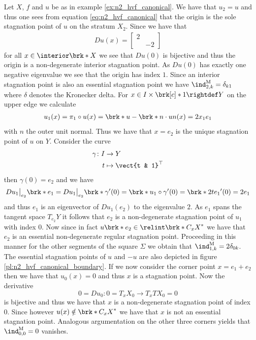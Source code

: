 \begin{example}\label{ex:n2_hvf_index}
  Let $X$, $f$ and $u$ be as in example \ref{ex:n2_hvf_canonical}.
  We have that $u_2=u$ and thus
  one sees from equation \eqref{eq:n2_hvf_canonical}
  that the origin is the sole stagnation point of $u$ on the stratum $X_2$. Since we have that
  \begin{align*}
    Du(x) = \begin{bmatrix}
      2 & \\
       & -2
    \end{bmatrix}
  \end{align*}
  for all $x\in\openX$ we see that $Du(0)$ is bijective and thus the origin is a non-degenerate interior stagnation point.
  As $Du(0)$ has
  exactly one negative eigenvalue we see that the origin has index $1$. 
  Since an interior stagnation point is also an essential stagnation point 
  we have $\ind^\text{M}_{2,k}=\delta_{k1}$ where $\delta$ denotes the Kronecker delta.
  For $x\in I\times\brk[c]*{1}\rightdef Y$ on the upper edge we calculate
  \begin{align*}
    u_1(x)=\pi_1\circ u(x)=\brk*{u-\brk*{n\cdot u}n}(x)
    =2x_1e_1
  \end{align*}
  with $n$ the outer unit normal.
  Thus we have that $x=e_2$ is the unique stagnation point of $u$ on $Y$.
  Consider the curve
  \begin{align*}
    \gamma\colon I&\to Y\\
    t&\mapsto \vect{t & 1}^\top
  \end{align*}
  then $\gamma(0)=e_2$ and we have
  \begin{align*}
    Du_1\big\vert_{e_2}\brk*{e_1}
    =Du_1\big\vert_{e_2}\brk*{\gamma'(0)}
    =\brk*{u_1\circ \gamma}'(0)
    =\brk*{2te_1}'(0)=2e_1
  \end{align*}
  and thus $e_1$ is an eigenvector of $Du_1(e_2)$ to the eigenvalue $2$. As $e_1$
  spans the tangent space $T_{e_2}Y$ it follows that $e_2$ is a non-degenerate stagnation point
  of $u_1$ with index $0$.
  Now since in fact $u\brk*{e_2}\in\relint\brk*{C_xX}^*$ we have that $e_2$ is an essential non-degenerate regular 
  stagnation point.
  Proceeding in this manner for the other segments of the square $\Sigma$ we obtain that
  $\ind^\text{M}_{1,k}=2\delta_{0k}$.
  The essential stagnation points of $u$ and $-u$ are also depicted in figure \ref{pl:n2_hvf_canonical_boundary}.
  If we now consider the corner point $x=e_1+e_2$ then we have that $u_0(x)=0$ and thus $x$ is a stagnation
  point.
  Now the derivative
  $$0=Du_0\colon 0=T_xX_0\to T_xTX_0=0$$
  is bijective and thus
  we have that $x$ is a non-degenerate stagnation point of
  index $0$. Since however $u(x)\notin \brk*{C_xX}^*$ we have that $x$ is not an essential stagnation point.
  Analogous argumentation on the other three corners yields that $\ind^\text{M}_{0,0}=0$ vanishes.
\end{example}

